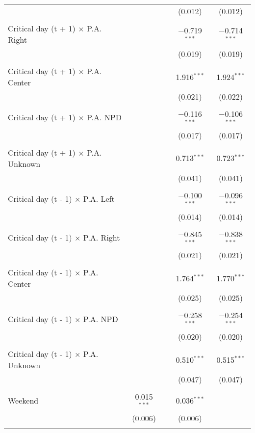 \documentclass[
]{article}
\begin{document}
\begin{table}[!htbp]
{\begin{tabular}{@{\extracolsep{5pt}}lcccc}
  &  &  & (0.012) & (0.012) \\ 
  & & & & \\ 
 Critical day (t + 1) $\times$ P.A. Right &  &  & $-$0.719$^{***}$ & $-$0.714$^{***}$ \\ 
  &  &  & (0.019) & (0.019) \\ 
  & & & & \\ 
 Critical day (t + 1) $\times$ P.A. Center &  &  & 1.916$^{***}$ & 1.924$^{***}$ \\ 
  &  &  & (0.021) & (0.022) \\ 
  & & & & \\ 
 Critical day (t + 1) $\times$ P.A. NPD &  &  & $-$0.116$^{***}$ & $-$0.106$^{***}$ \\ 
  &  &  & (0.017) & (0.017) \\ 
  & & & & \\ 
 Critical day (t + 1) $\times$ P.A. Unknown &  &  & 0.713$^{***}$ & 0.723$^{***}$ \\ 
  &  &  & (0.041) & (0.041) \\ 
  & & & & \\ 
 Critical day (t - 1) $\times$ P.A. Left &  &  & $-$0.100$^{***}$ & $-$0.096$^{***}$ \\ 
  &  &  & (0.014) & (0.014) \\ 
  & & & & \\ 
 Critical day (t - 1) $\times$ P.A. Right &  &  & $-$0.845$^{***}$ & $-$0.838$^{***}$ \\ 
  &  &  & (0.021) & (0.021) \\ 
  & & & & \\ 
 Critical day (t - 1) $\times$ P.A. Center &  &  & 1.764$^{***}$ & 1.770$^{***}$ \\ 
  &  &  & (0.025) & (0.025) \\ 
  & & & & \\ 
 Critical day (t - 1) $\times$ P.A. NPD &  &  & $-$0.258$^{***}$ & $-$0.254$^{***}$ \\ 
  &  &  & (0.020) & (0.020) \\ 
  & & & & \\ 
 Critical day (t - 1) $\times$ P.A. Unknown &  &  & 0.510$^{***}$ & 0.515$^{***}$ \\ 
  &  &  & (0.047) & (0.047) \\ 
  & & & & \\ 
 Weekend & 0.015$^{***}$ &  & 0.036$^{***}$ &  \\ 
  & (0.006) &  & (0.006) &  \\ 
  & & & & \\ 

\end{tabular}}
\end{table}
\end{document}
